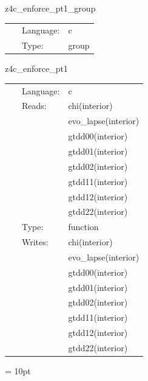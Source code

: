 \vspace{5mm}


\hspace{5mm} z4c\_enforce\_pt1\_group 

\hspace{5mm}{\it group for function `z4c\_enforce\_pt1`. generated by einsteinengine. } 


\hspace{5mm}

 \begin{tabular*}{160mm}{cll} 
~ & Language:  & c \\ 
~ & Type:  & group \\ 
\end{tabular*} 


\vspace{5mm}


\hspace{5mm} z4c\_enforce\_pt1 

\hspace{5mm}{\it function `z4c\_enforce\_pt1` generated by einsteinengine. } 


\hspace{5mm}

 \begin{tabular*}{160mm}{cll} 
~ & Language:  & c \\ 
~ & Reads:  & chi(interior) \\ 
~& ~ &evo\_lapse(interior)\\ 
~& ~ &gtdd00(interior)\\ 
~& ~ &gtdd01(interior)\\ 
~& ~ &gtdd02(interior)\\ 
~& ~ &gtdd11(interior)\\ 
~& ~ &gtdd12(interior)\\ 
~& ~ &gtdd22(interior)\\ 
~ & Type:  & function \\ 
~ & Writes:  & chi(interior) \\ 
~& ~ &evo\_lapse(interior)\\ 
~& ~ &gtdd00(interior)\\ 
~& ~ &gtdd01(interior)\\ 
~& ~ &gtdd02(interior)\\ 
~& ~ &gtdd11(interior)\\ 
~& ~ &gtdd12(interior)\\ 
~& ~ &gtdd22(interior)\\ 
\end{tabular*} 



\vspace{5mm}\parskip = 10pt 
